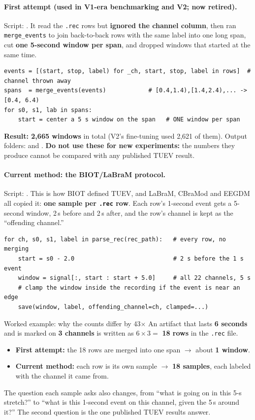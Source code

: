 \documentclass[11pt]{article}
\begin{document}
\paragraph{First attempt (used in V1-era benchmarking and V2; now retired).}
Script: . It read the \texttt{.rec} rows
but \textbf{ignored the channel column}, then ran \texttt{merge\_events} to join
back-to-back rows with the same label into one long span, cut \textbf{one
5-second window per span}, and dropped windows that started at the same time.
\begin{lstlisting}
events = [(start, stop, label) for _ch, start, stop, label in rows]  # channel thrown away
spans  = merge_events(events)            # [0.4,1.4),[1.4,2.4),... -> [0.4, 6.4)
for s0, s1, lab in spans:
    start = center a 5 s window on the span   # ONE window per span
\end{lstlisting}
\textbf{Result: 2,665 windows} in total (V2's fine-tuning used 2,621 of them).
Output folders:  and .
\textbf{Do not use these for new experiments:} the numbers they produce cannot be
compared with any published TUEV result.

\paragraph{Current method: the BIOT/LaBraM protocol.}
Script: . This is how BIOT defined
TUEV, and LaBraM, CBraMod and EEGDM all copied it: \textbf{one sample per
\texttt{.rec} row}. Each row's 1-second event gets a 5-second window, 2\,s before
and 2\,s after, and the row's channel is kept as the ``offending channel.''
\begin{lstlisting}
for ch, s0, s1, label in parse_rec(rec_path):   # every row, no merging
    start = s0 - 2.0                            # 2 s before the 1 s event
    window = signal[:, start : start + 5.0]     # all 22 channels, 5 s
    # clamp the window inside the recording if the event is near an edge
    save(window, label, offending_channel=ch, clamped=...)
\end{lstlisting}

\begin{keybox}{Worked example: why the counts differ by 43$\times$}
An artifact that lasts \textbf{6 seconds} and is marked on \textbf{3 channels}
is written as $6 \times 3 = $ \textbf{18 rows} in the \texttt{.rec} file.
\begin{itemize}[nosep,leftmargin=1.4em]
  \item \textbf{First attempt:} the 18 rows are merged into one span
  $\rightarrow$ about \textbf{1 window}.
  \item \textbf{Current method:} each row is its own sample
  $\rightarrow$ \textbf{18 samples}, each labeled with the channel it came from.
\end{itemize}
The question each sample asks also changes, from ``what is going on in this 5-s
stretch?'' to ``what is this 1-second event on this channel, given the 5\,s
around it?'' The second question is the one published TUEV results answer.
\end{keybox}
\end{document}
